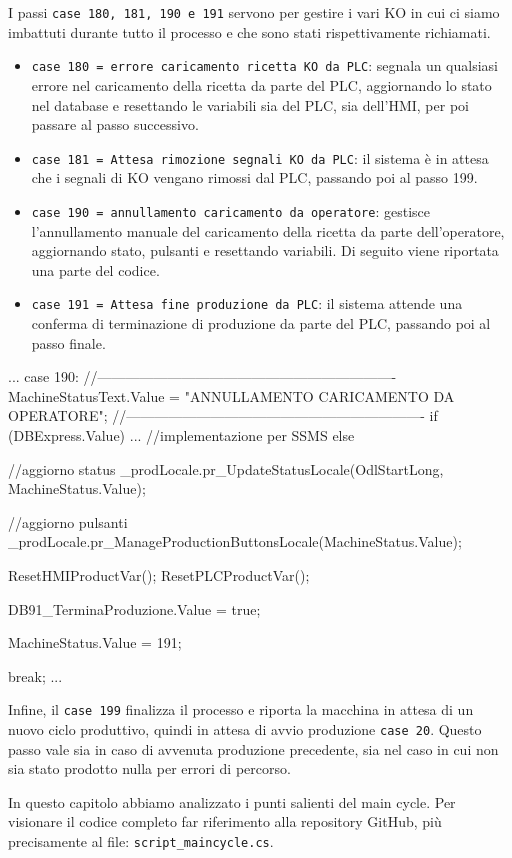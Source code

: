I passi \verb|case 180, 181, 190 e 191| servono per gestire i vari KO in cui ci siamo imbattuti durante tutto il processo e che sono stati rispettivamente richiamati.
\begin{itemize}
    \item \verb|case 180 = errore caricamento ricetta KO da PLC|: segnala un qualsiasi errore nel caricamento della ricetta da parte del PLC, aggiornando lo stato nel database e resettando le variabili sia del PLC, sia dell'HMI, per poi passare al passo successivo.
    \item \verb|case 181 = Attesa rimozione segnali KO da PLC|: il sistema è in attesa che i segnali di KO vengano rimossi dal PLC, passando poi al passo 199.
    \item \verb|case 190 = annullamento caricamento da operatore|: gestisce l'annullamento manuale del caricamento della ricetta da parte dell'operatore, aggiornando stato, pulsanti e resettando variabili. Di seguito viene riportata una parte del codice.
    \item \verb|case 191 = Attesa fine produzione da PLC|: il sistema attende una conferma di terminazione di produzione da parte del PLC, passando poi al passo finale.
\end{itemize}
\begin{csharp}
...
    case 190:
    //----------------------------------------------------------------
    MachineStatusText.Value = "ANNULLAMENTO CARICAMENTO DA OPERATORE";
    //----------------------------------------------------------------
    if (DBExpress.Value)
    {
        ... //implementazione per SSMS
    }
    else
    {
        //aggiorno status
        _prodLocale.pr_UpdateStatusLocale(OdlStartLong, MachineStatus.Value);

        //aggiorno pulsanti
        _prodLocale.pr_ManageProductionButtonsLocale(MachineStatus.Value);

        ResetHMIProductVar();
        ResetPLCProductVar();

        DB91_TerminaProduzione.Value = true;

        MachineStatus.Value = 191;
    }

    break;
...
\end{csharp}
Infine, il \verb|case 199| finalizza il processo e riporta la macchina in attesa di un nuovo ciclo produttivo, quindi in attesa di avvio produzione \verb|case 20|. Questo passo vale sia in caso di avvenuta produzione precedente, sia nel caso in cui non sia stato prodotto nulla per errori di percorso.
\begin{csharp}
...
        case 199:
        //----------------------------------------------------------------------
        MachineStatusText.Value = "Termina produzione completata correttamente";
        //----------------------------------------------------------------------

        if (!DB92_AckTerminaProduzione.Value)
        {
            MachineStatus.Value = 20;
        }

        break;

    default:
        break;
}
...
\end{csharp}
In questo capitolo abbiamo analizzato i punti salienti del main cycle. Per visionare il codice completo far riferimento alla repository GitHub, più precisamente al file: \verb|script_maincycle.cs|.

